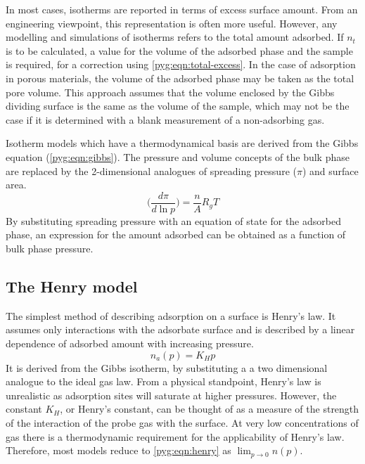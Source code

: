 In most cases, isotherms are reported in terms of excess surface 
amount. From an engineering viewpoint, this representation
is often more useful. However, any modelling and simulations of 
isotherms refers to the total amount adsorbed.
If \(n_t\) is to be calculated, a value
for the volume of the adsorbed phase and the sample is required, for a 
correction using \autoref{pyg:eqn:total-excess}.
In the case of adsorption in porous materials, the volume of the
adsorbed phase may be taken as the total pore volume. This approach
assumes that the volume enclosed by the Gibbs dividing surface is
the same as the volume of the sample, which may not be the case 
if it is determined with a blank measurement of a 
non-adsorbing gas.

Isotherm models which have a thermodynamical basis are derived
from the Gibbs equation (\autoref{pyg:eqn:gibbs}). 
The pressure and volume concepts of the bulk phase
are replaced by the 2-dimensional analogues of spreading pressure 
(\( \pi \)) and surface area.
%
\begin{equation}\label{pyg:eqn:gibbs}
	\Big(\frac{d\pi}{d\ln{p}}\Big) = \frac{n}{A} R_g T
\end{equation}
%
By substituting spreading pressure with an equation
of state for the adsorbed phase, an expression for the amount
adsorbed can be obtained as a function of bulk phase pressure.

\subsection{The Henry model}\label{pyg:models:henry}

The simplest method of describing adsorption on a
surface is Henry’s law. It assumes only interactions
with the adsorbate surface and is described by a
linear dependence of adsorbed amount with
increasing pressure.
%
\begin{equation}\label{pyg:eqn:henry}
	n_a(p) = K_H p
\end{equation}
%
It is derived from the Gibbs isotherm, by substituting a
a two dimensional analogue to the ideal gas law.
From a physical standpoint, Henry's law is unrealistic as adsorption sites
will saturate at higher pressures. However, the constant \(K_H\),
or Henry’s constant, can be thought of as a measure of the strength
of the interaction of the probe gas with the surface. At very
low concentrations of gas there is a
thermodynamic requirement for the applicability of Henry's law.
Therefore, most models reduce to \autoref{pyg:eqn:henry}
as \(\lim_{p \to 0} n(p)\).

